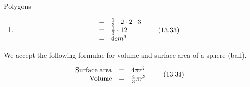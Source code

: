 \begin{exercises}{Polygons}
{\begin{mdframed}[linewidth=4, leftmargin=40, rightmargin=40]
\begin{exercise}
\begin{enumerate}[noitemsep, label=\textbf{Step} \textbf{\arabic*}. ]
    \begin{equation}
    V=\frac{1}{3}A\ensuremath{\cdot}h,\tag{13.31}
      \end{equation}
    
      
      \label{m39357*id63518}where $A$ is the area of the base and $h$ is the height of the pyramid. For a square base this means\par 
      \label{m39357*id63540}\nopagebreak\noindent{}
        
    \begin{equation}
    V=\frac{1}{3}a\ensuremath{\cdot}a\ensuremath{\cdot}h\tag{13.32}
      \end{equation}
    
      
      \label{m39357*id63570}where $a$ is the length of the side of the square base.\par 
      \item  
      \label{m39357*id63597}\nopagebreak\noindent{}
        
    \begin{equation}
    \begin{array}{ccc}& =& \frac{1}{3}\ensuremath{\cdot}2\ensuremath{\cdot}2\ensuremath{\cdot}3\hfill \\ & =& \frac{1}{3}\ensuremath{\cdot}12\hfill \\ & =& 4c{m}^{3}\hfill \end{array}\tag{13.33}
      \end{equation}
    
      
      
      \end{enumerate}
         

    \end{exercise}
    \end{mdframed}
    }
    \noindent
  
      \label{m39357*id63694}We accept the following formulae for volume and surface area of a sphere (ball).\par 
      \label{m39357*id63698}\nopagebreak\noindent{}
        
    \begin{equation}
    \begin{array}{ccc}\hfill \mathrm{Surface\; area}& =& 4\pi {r}^{2}\hfill \\ \hfill \mathrm{Volume}& =& \frac{4}{3}\pi {r}^{3}\hfill \end{array}\tag{13.34}
      \end{equation}
    
      
\par
            \label{m39357*eip-219}\vspace{.5cm} 
      

\end{exercises}
